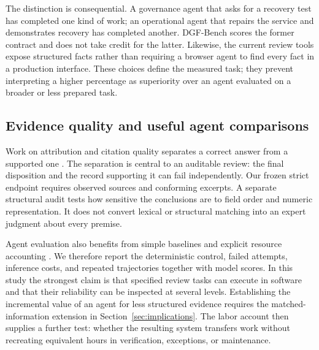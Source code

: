 The distinction is consequential. A governance agent that asks for a recovery test has
completed one kind of work; an operational agent that repairs the service and demonstrates
recovery has completed another. DGF-Bench scores the former contract and does not take credit
for the latter. Likewise, the current review tools expose structured facts rather than
requiring a browser agent to find every fact in a production interface. These choices define
the measured task; they prevent interpreting a higher percentage as superiority over an
agent evaluated on a broader or less prepared task.

\subsection{Evidence quality and useful agent comparisons}

Work on attribution and citation quality separates a correct answer from a supported one
\citep{gao2023,rashkin2023}. The separation is central to an auditable review: the final
disposition and the record supporting it can fail independently. Our frozen strict endpoint
requires observed sources and conforming excerpts. A separate structural audit tests how
sensitive the conclusions are to field order and numeric representation. It does not convert
lexical or structural matching into an expert judgment about every premise.

Agent evaluation also benefits from simple baselines and explicit resource accounting
\citep{kapoor2024}. We therefore report the deterministic control, failed attempts, inference
costs, and repeated trajectories together with model scores. In this study the strongest
claim is that specified review tasks can execute in software and that their reliability can
be inspected at several levels. Establishing the incremental value of an agent for less
structured evidence requires the matched-information extension in Section~\ref{sec:implications}.
The labor account then supplies a further test: whether the resulting system transfers work
without recreating equivalent hours in verification, exceptions, or maintenance.
